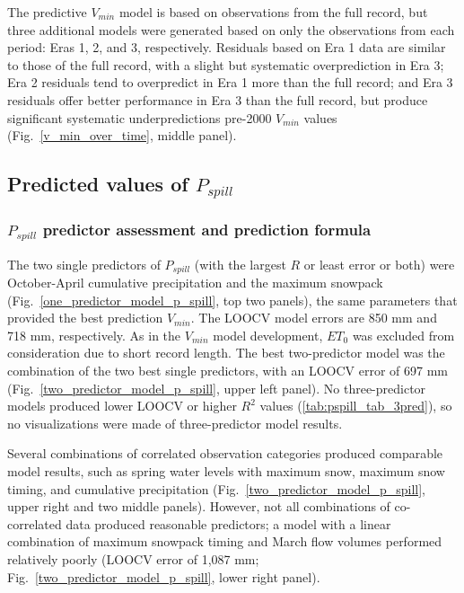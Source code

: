\documentclass[hess, manuscript]{copernicus}
\begin{document}
The predictive $V_{min}$ model is based on observations from the full
record, but three additional models were generated based on only the
observations from each period: Eras 1, 2, and 3, respectively. Residuals
based on Era 1 data are similar to those of the full record, with a
slight but systematic overprediction in Era 3; Era 2 residuals tend to
overpredict in Era 1 more than the full record; and Era 3 residuals
offer better performance in Era 3 than the full record, but produce
significant systematic underpredictions pre-2000 $V_{min}$ values
(Fig.~\ref{v_min_over_time}, middle panel).

\subsection{\texorpdfstring{Predicted values of
$P_{spill}$}{Predicted values of P\_\{spill\}}}

\subsubsection{\texorpdfstring{$P_{spill}$ predictor assessment and
prediction
formula}{P\_\{spill\} predictor assessment and prediction formula}}

The two single predictors of $P_{spill}$ (with the largest $R$ or
least error or both) were October-April cumulative precipitation and the
maximum snowpack (Fig.~\ref{one_predictor_model_p_spill}, top two
panels), the same parameters that provided the best prediction
$V_{min}$. The LOOCV model errors are 850 mm and 718 mm, respectively.
As in the $V_{min}$ model development, $ET_{0}$ was excluded from
consideration due to short record length. The best two-predictor model
was the combination of the two best single predictors, with an LOOCV
error of 697 mm (Fig.~\ref{two_predictor_model_p_spill}, upper left
panel). No three-predictor models produced lower LOOCV or higher $R^2$
values (\autoref{tab:pspill_tab_3pred}), so no visualizations were made
of three-predictor model results.

Several combinations of correlated observation categories produced
comparable model results, such as spring water levels with maximum snow,
maximum snow timing, and cumulative precipitation
(Fig.~\ref{two_predictor_model_p_spill}, upper right and two middle
panels). However, not all combinations of co-correlated data produced
reasonable predictors; a model with a linear combination of maximum
snowpack timing and March flow volumes performed relatively poorly
(LOOCV error of 1,087 mm; Fig.~\ref{two_predictor_model_p_spill},
lower right panel).
\end{document}
